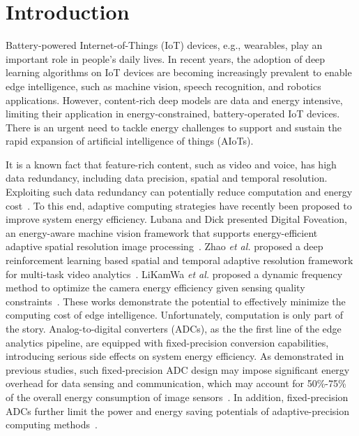 \section{Introduction}

Battery-powered Internet-of-Things (IoT) devices, e.g., wearables, play an important role in people's daily lives.
In recent years, the adoption of deep learning algorithms on IoT devices are becoming increasingly prevalent to enable edge
intelligence, such as machine vision, speech recognition, and robotics applications. However, content-rich deep models are data 
and energy intensive, limiting their application in energy-constrained, battery-operated IoT devices. There is an urgent need to 
tackle energy challenges to support and sustain the rapid expansion of artificial intelligence of things (AIoTs).

It is a known fact that feature-rich content, such as video and voice, has high data redundancy, including data precision, spatial
and temporal resolution. Exploiting such data redundancy
can potentially reduce computation and energy cost~\cite{lubana_digital_2018, zhao_reinforcement-learning-based_2022}. 
To this end, adaptive computing strategies have recently been proposed to improve system energy efficiency. 
Lubana and Dick presented Digital Foveation, an energy-aware machine vision framework that supports energy-efficient adaptive spatial resolution image processing~\cite{lubana_digital_2018}. 
Zhao {\it et al.} proposed a deep reinforcement learning based spatial and temporal adaptive resolution framework for multi-task video analytics~\cite{zhao_reinforcement-learning-based_2022}. 
LiKamWa {\it et al.} proposed a dynamic frequency method to optimize the camera energy efficiency given sensing quality constraints~\cite{likamwa_energy_2013}. These works demonstrate the potential to effectively minimize the computing cost of edge intelligence. 
Unfortunately, computation is only part of the story. Analog-to-digital converters (ADCs), as the the first line of the edge 
analytics pipeline, are equipped with fixed-precision conversion capabilities, introducing serious side effects on system energy 
efficiency.  As demonstrated in previous studies, such fixed-precision ADC design may impose significant energy overhead for
data sensing and communication, which may account for 50\%-75\% of the overall energy consumption of 
image sensors~\cite{choi_energyillumination-adaptive_2015,takayanagi_125-inch_2005,kitamura_33-megapixel_2012}. 
In addition, fixed-precision ADCs further limit the power and energy saving potentials of adaptive-precision computing methods~\cite{leibe_xnor-net_2016,li_ternary_2016,park_energy-efficient_2018}.

